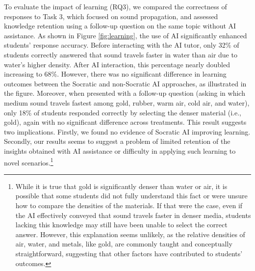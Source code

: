 \documentclass[
  12pt,
]{article}
\begin{document}
To evaluate the impact of learning (RQ3), we compared the correctness of responses to Task 3, which focused on sound propagation, and assessed knowledge retention using a follow-up question on the same topic without AI assistance. As shown in Figure \ref{fig:learning}, the use of AI significantly enhanced students' response accuracy. Before interacting with the AI tutor, only 32\% of students correctly answered that sound travels faster in water than air due to water's higher density. After AI interaction, this percentage nearly doubled increasing to 68\%. However, there was no significant difference in learning outcomes between the Socratic and non-Socratic AI approaches, as illustrated in the figure. Moreover, when presented with a follow-up question (asking in which medium sound travels fastest among gold, rubber, warm air, cold air, and water), only 18\% of students responded correctly by selecting the denser material (i.e., gold), again with no significant difference across treatments. This result suggests two implications. Firstly, we found no evidence of Socratic AI improving learning. Secondly, our results seems to suggest a problem of limited retention of the insights obtained with AI assistance or difficulty in applying such learning to novel scenarios.\footnote{While it is true that gold is significantly denser than water or air, it is possible that some students did not fully understand this fact or were unsure how to compare the densities of the materials. If that were the case, even if the AI effectively conveyed that sound travels faster in denser media, students lacking this knowledge may still have been unable to select the correct answer. However, this explanation seems unlikely, as the relative densities of air, water, and metals, like gold, are commonly taught and conceptually straightforward, suggesting that other factors have contributed to students' outcomes.}
\end{document}
